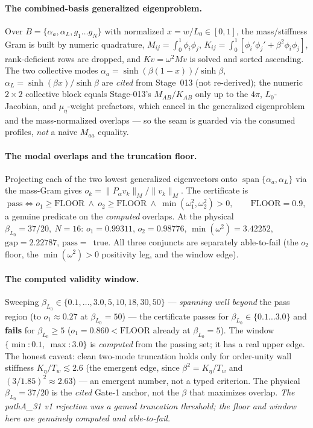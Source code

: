 \paragraph{The combined-basis generalized eigenproblem.}
Over \(B=\{\alpha_a,\alpha_L,g_1\ldots g_N\}\) with normalized \(x=w/L_0\in[0,1]\),
the mass/stiffness Gram is built by numeric quadrature,
\(M_{ij}=\int_0^1\phi_i\phi_j\), \(K_{ij}=\int_0^1[\phi_i'\phi_j'+\beta^2\phi_i\phi_j]\),
rank-deficient rows are dropped, and \(K v=\omega^2 M v\) is solved and sorted
ascending. The two collective modes \(\alpha_a=\sinh(\beta(1-x))/\sinh\beta\),
\(\alpha_L=\sinh(\beta x)/\sinh\beta\) are \emph{cited} from Stage~013 (not
re-derived); the numeric \(2\times2\) collective block equals Stage-013's
\(M_{AB}/K_{AB}\) only up to the \(4\pi\), \(L_0\)-Jacobian, and \(\mu_\eta\)-weight
prefactors, which cancel in the generalized eigenproblem and the mass-normalized
overlaps --- so the seam is guarded via the consumed profiles, \emph{not} a naive
\(M_{aa}\) equality.

\paragraph{The modal overlaps and the truncation floor.}
Projecting each of the two lowest generalized eigenvectors onto
\(\operatorname{span}\{\alpha_a,\alpha_L\}\) via the mass-Gram gives
\(o_k=\lVert P_\alpha v_k\rVert_M/\lVert v_k\rVert_M\). The certificate is
\[
  \mathrm{pass}\iff o_1\ge\mathrm{FLOOR}\ \wedge\ o_2\ge\mathrm{FLOOR}\ \wedge\ \min(\omega_1^2,\omega_2^2)>0,
  \qquad \mathrm{FLOOR}=0.9,
\]
a genuine predicate on the \emph{computed} overlaps. At the physical
\(\beta_{L_0}=37/20,\ N=16\): \(o_1=0.99311\), \(o_2=0.98776\),
\(\min(\omega^2)=3.42252\), \(\mathrm{gap}=2.22787\), \(\mathrm{pass}=\)~true. All
three conjuncts are separately able-to-fail (the \(o_2\) floor, the
\(\min(\omega^2)>0\) positivity leg, and the window edge).

\paragraph{The computed validity window.}
Sweeping \(\beta_{L_0}\in\{0.1,\ldots,3.0,5,10,18,30,50\}\) --- \emph{spanning well
beyond} the pass region (to \(o_1\approx0.27\) at \(\beta_{L_0}=50\)) --- the
certificate passes for \(\beta_{L_0}\in\{0.1\ldots3.0\}\) and \textbf{fails} for
\(\beta_{L_0}\ge5\) (\(o_1=0.860<\mathrm{FLOOR}\) already at \(\beta_{L_0}=5\)). The
window \(\{{\min}{:}0.1,\ {\max}{:}3.0\}\) is \emph{computed} from the passing set;
it has a real upper edge. The honest caveat: clean two-mode truncation holds only
for order-unity wall stiffness \(K_\eta/T_w\lesssim2.6\) (the emergent edge, since
\(\beta^2=K_\eta/T_w\) and \((3/1.85)^2\approx2.63\)) --- an emergent number, not a
typed criterion. The physical \(\beta_{L_0}=37/20\) is the \emph{cited} Gate-1
anchor, not the \(\beta\) that maximizes overlap. \emph{The pathA\_31 v1 rejection
was a gamed truncation threshold; the floor and window here are genuinely computed
and able-to-fail.}

